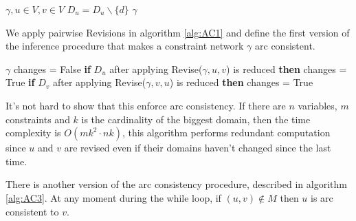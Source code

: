 \documentclass[10pt, letterpaper]{report}
\begin{document}
\begin{algorithm}
    \caption{Revise}\label{alg:revise}
    \begin{algorithmic}
    \Require $\gamma,u\in V,v\in V$
    \State $D_u=D_u\backslash\{d\}$ 
    \EndIf
    \EndFor 
    \State\Return $\gamma$
    \end{algorithmic}
\end{algorithm}

We apply pairwise Revisions in algorithm \ref{alg:AC1} and define the first version of the inference procedure that makes a constraint network $\gamma$ arc consistent.\bigskip

\begin{algorithm}
    \caption{AC\_1}\label{alg:AC1}
    \begin{algorithmic}
    \Require $\gamma$
    \State changes = False
    \State\textbf{if } $D_u$ after applying Revise($\gamma,u,v$) is reduced \textbf{ then } changes = True
    \State\textbf{if } $D_v$ after applying Revise($\gamma,v,u$) is reduced \textbf{ then } changes = True
    \EndFor
    \EndWhile
    \end{algorithmic}
\end{algorithm}

It's not hard to show that this enforce arc consistency. If there are $n$ variables, $m$ constraints and $k$ is the cardinality of the biggest domain, then the time complexity is $O(mk^2\cdot nk)$, this algorithm performs redundant computation since $u$ and $v$ are revised even if their domains
haven't changed since the last time.\bigskip 

\noindent There is another version of the arc consistency procedure, described in algorithm \ref{alg:AC3}. At any moment during the while loop, if $(u,v)\notin M$ then $u$ is arc consistent to $v$.
\end{document}
